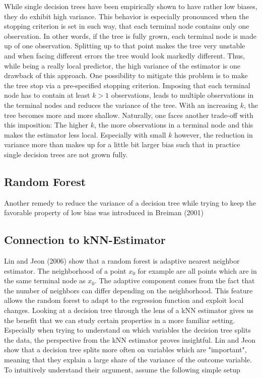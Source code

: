 {While single decision trees have been empirically shown to have rather low biases, they do exhibit high variance. This behavior is especially pronounced when the stopping criterion is set in such way, that each terminal node contains only one observation. In other words, if the tree is fully grown, each terminal node is made up of one observation. Splitting up to that point makes the tree very unstable and when facing different errors the tree would look markedly different. Thus, while being a really local predictor, the high variance of the estimator is one drawback of this approach. One possibility to mitigate this problem is to make the tree stop via a pre-specified stopping criterion. Imposing that each terminal node has to contain at least $k > 1$ observations, leads to multiple observations in the terminal nodes and reduces the variance of the tree. With an increasing $k$, the tree becomes more and more shallow. Naturally, one faces another trade-off with this imposition: The higher $k$, the more observations in a terminal node and this makes the estimator less local. Especially with small $k$ however, the reduction in variance more than makes up for a little bit larger bias such that in practice single decision trees are not grown fully.


\subsection{Random Forest}

Another remedy to reduce the variance of a decision tree while trying to keep the favorable property of low bias was introduced in Breiman (2001)

\subsection{Connection to kNN-Estimator}
Lin and Jeon (2006) show that a random forest is adaptive nearest neighbor estimator. 
The neighborhood of a point $x_0$ for example are all points which are in the same terminal node as $x_0$.
The adaptive component comes from the fact that the number of neighbors can differ depending on the neighborhood. This feature allows the random forest to adapt to the regression function and exploit local changes.
Looking at a decision tree through the lens of a kNN estimator gives us the benefit that we can study certain properties in a more familiar setting.
Especially when trying to understand on which variables the decision tree splits the data, the perspective from the kNN estimator proves insightful.
Lin and Jeon show that a decision tree splits more often on variables which are "important", meaning that they explain a large share of the variance of the outcome variable. 
To intuitively understand their argument, assume the following simple setup 

}
